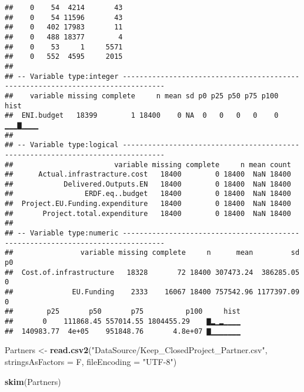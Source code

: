 \documentclass[]{article}
\newenvironment{Shaded}{\begin{snugshade}}{\end{snugshade}}
\newcommand{\DataTypeTok}[1]{\textcolor[rgb]{0.13,0.29,0.53}{#1}}
\newcommand{\KeywordTok}[1]{\textcolor[rgb]{0.13,0.29,0.53}{\textbf{#1}}}
\newcommand{\NormalTok}[1]{#1}
\newcommand{\StringTok}[1]{\textcolor[rgb]{0.31,0.60,0.02}{#1}}
\begin{document}
\begin{verbatim}
##    0    54  4214       43
##    0    54 11596       43
##    0   402 17983       11
##    0   488 18377        4
##    0    53     1     5571
##    0   552  4595     2015
## 
## -- Variable type:integer --------------------------------------------------------------------------------
##    variable missing complete     n mean sd p0 p25 p50 p75 p100     hist
##  ENI.budget   18399        1 18400    0 NA  0   0   0   0    0 ▁▁▁▇▁▁▁▁
## 
## -- Variable type:logical --------------------------------------------------------------------------------
##                        variable missing complete     n mean count
##      Actual.infrastracture.cost   18400        0 18400  NaN 18400
##            Delivered.Outputs.EN   18400        0 18400  NaN 18400
##                 ERDF.eq..budget   18400        0 18400  NaN 18400
##  Project.EU.Funding.expenditure   18400        0 18400  NaN 18400
##       Project.total.expenditure   18400        0 18400  NaN 18400
## 
## -- Variable type:numeric --------------------------------------------------------------------------------
##                variable missing complete     n      mean         sd p0
##  Cost.of.infrastructure   18328       72 18400 307473.24  386285.05  0
##              EU.Funding    2333    16067 18400 757542.96 1177397.09  0
##        p25       p50       p75          p100     hist
##       0    111868.45 557014.55 1804455.29    ▇▂▁▂▁▁▁▁
##  140983.77  4e+05    951848.76       4.8e+07 ▇▁▁▁▁▁▁▁
\end{verbatim}

\begin{Shaded}
\begin{Highlighting}[]
\NormalTok{Partners <-}\StringTok{ }\KeywordTok{read.csv2}\NormalTok{(}\StringTok{"DataSource/Keep_ClosedProject_Partner.csv"}\NormalTok{, }\DataTypeTok{stringsAsFactors =}\NormalTok{ F, }\DataTypeTok{fileEncoding =} \StringTok{"UTF-8"}\NormalTok{)}

\KeywordTok{skim}\NormalTok{(Partners)}
\end{Highlighting}
\end{Shaded}
\end{document}
